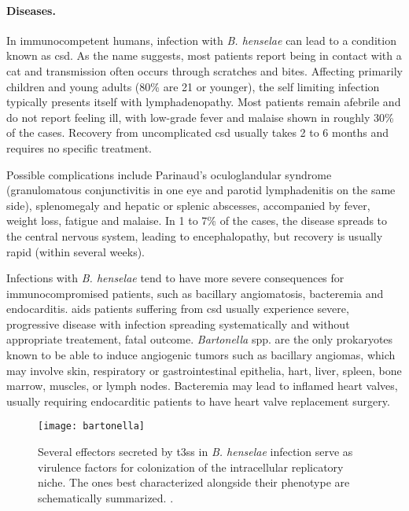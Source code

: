\paragraph{Diseases.}
In immunocompetent humans, infection with \textit{B. henselae} can lead to a condition known as \gls{csd}. As the name suggests, most patients report being in contact with a cat and transmission often occurs through scratches and bites. Affecting primarily children and young adults (80\% are 21 or younger), the self limiting infection typically presents itself with lymphadenopathy. Most patients remain afebrile and do not report feeling ill, with low-grade fever and malaise shown in roughly 30\% of the cases. Recovery from uncomplicated \gls{csd} usually takes 2 to 6 months and requires no specific treatment.

Possible complications include Parinaud's oculoglandular syndrome (granulomatous conjunctivitis in one eye and parotid lymphadenitis on the same side), splenomegaly and hepatic or splenic abscesses, accompanied by fever, weight loss, fatigue and malaise. In 1 to 7\% of the cases, the disease spreads to the central nervous system, leading to encephalopathy, but recovery is usually rapid (within several weeks).

Infections with \textit{B. henselae} tend to have more severe consequences for immunocompromised patients, such as bacillary angiomatosis, bacteremia and endocarditis. \Gls{aids} patients suffering from \gls{csd} usually experience severe, progressive disease with infection spreading systematically and without appropriate treatement, fatal outcome. \textit{Bartonella} spp. are the only prokaryotes known to be able to induce angiogenic tumors such as bacillary angiomas, which may involve skin, respiratory or gastrointestinal epithelia, hart, liver, spleen, bone marrow, muscles, or lymph nodes. Bacteremia may lead to inflamed heart valves, usually requiring endocarditic patients to have heart valve replacement surgery.

\begin{figure}
  \centering
  \texttt{[image: bartonella]}
  \caption[Bacterial effectors of \textit{B. henselae}, secreted by \gls{t4ss} into the host cytosol.]{Several effectors secreted by \gls{t3ss} in \textit{B. henselae} infection serve as virulence factors for colonization of the intracellular replicatory niche. The ones best characterized alongside their phenotype are schematically summarized. \citep{Harms2012}.}
  \label{fig:bartonella}
\end{figure}

